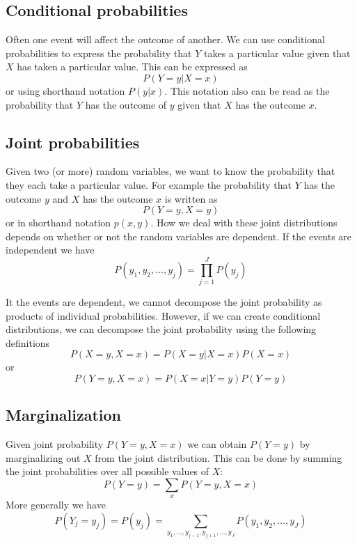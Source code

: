 \documentclass[a4paper,11pt]{article} %
\begin{document}
\subsection{Conditional probabilities}

Often one event will affect the outcome of another.
We can use conditional probabilities to express the probability that $Y$
takes a particular value given that $X$ has taken a particular value.
This can be expressed as
\begin{equation}
P(Y=y | X=x)
\end{equation}
or using shorthand notation $P(y|x)$.
This notation also can be read as the probability that $Y$ has the outcome of $y$ given
that $X$ has the outcome $x$.


\subsection{Joint probabilities}

Given two (or more) random variables, we want to know the probability that they each take a particular
value. For example the probability that $Y$ has the outcome $y$ and $X$ has the outcome $x$ is
written as
\begin{equation}
P(Y=y,X=y)
\end{equation}
or in shorthand notation $p(x,y)$. How we deal with these joint distributions depends on whether
or not the random variables are dependent. If the events are independent we have
\begin{equation}
P(y_1,y_2,\ldots,y_j) = \prod_{j=1}^{J} P(y_j)
\end{equation}

It the events are dependent, we cannot decompose the joint probability as products of
individual probabilities. However, if we can create conditional distributions, we can
decompose the joint probability using the following definitions
\begin{equation}
P(X=y,X=x) = P(X=y|X=x) P(X=x)
\end{equation}
or
\begin{equation}
P(Y=y,X=x) = P(X=x|Y=y) P(Y=y)
\end{equation}

\subsection{Marginalization}

Given joint probability $P(Y=y,X=x)$ we can obtain $P(Y=y)$ by marginalizing out $X$ from the
joint distribution. This can be done by summing the joint probabilities over all
possible values of $X$:
\begin{equation}
P(Y=y) = \sum_{x} P(Y=y,X=x)
\end{equation}
More generally we have
\begin{equation}
P(Y_j=y_j) = P(y_j) = \sum_{y_1,\ldots,y_{j-1},y_{j+1},\ldots,y_{J}}
P(y_1,y_2,\ldots,y_{J})
\end{equation}
\end{document}
